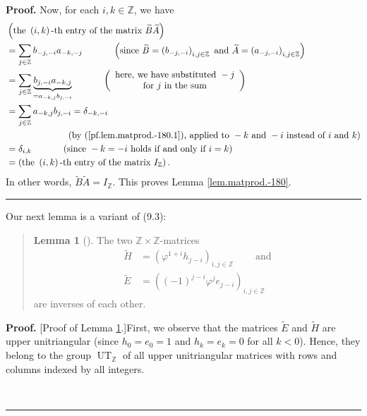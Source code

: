 \documentclass[numbers=enddot,12pt,final,onecolumn,notitlepage]{scrartcl}%
\newenvironment{statement}{\begin{quote}}{\end{quote}}
\theoremstyle{definition}
\newtheorem{lem}[theo]{Lemma}
\newenvironment{lemmain}[1][]
{\begin{statement}\begin{lem}[#1]}
{\end{lem}\end{statement}}
\newenvironment{proof}[1][Proof]{\noindent\textbf{#1.} }{\ \rule{0.5em}{0.5em}}
\newenvironment{lemmain}[1][Proof]{\noindent\textbf{#1.} }{\ \rule{0.5em}{0.5em}}
\let\sumnonlimits\sum
\renewcommand{\sum}{\sumnonlimits\limits}
\begin{document}
\begin{enumerate}
\begin{proof}
Now, for each $i,k\in\mathbb{Z}$, we have%
\begin{align*}
&  \left(  \text{the }\left(  i,k\right)  \text{-th entry of the matrix
}\widetilde{B}\widetilde{A}\right) \\
&  =\sum_{j\in\mathbb{Z}}b_{-j,-i}a_{-k,-j}\ \ \ \ \ \ \ \ \ \ \left(
\text{since }\widetilde{B}=\left(  b_{-j,-i}\right)  _{i,j\in\mathbb{Z}}\text{
and }\widetilde{A}=\left(  a_{-j,-i}\right)  _{i,j\in\mathbb{Z}}\right) \\
&  =\sum_{j\in\mathbb{Z}}\underbrace{b_{j,-i}a_{-k,j}}_{=a_{-k,j}b_{j,-i}%
}\ \ \ \ \ \ \ \ \ \ \left(
\begin{array}
[c]{c}%
\text{here, we have substituted }-j\\
\text{for }j\text{ in the sum}%
\end{array}
\right) \\
&  =\sum_{j\in\mathbb{Z}}a_{-k,j}b_{j,-i}=\delta_{-k,-i}\\
&  \ \ \ \ \ \ \ \ \ \ \ \ \ \ \ \ \ \ \ \ \left(  \text{by
(\ref{pf.lem.matprod.-180.1}), applied to }-k\text{ and }-i\text{ instead of
}i\text{ and }k\right) \\
&  =\delta_{i,k}\ \ \ \ \ \ \ \ \ \ \left(  \text{since }-k=-i\text{ holds if
and only if }i=k\right) \\
&  =\left(  \text{the }\left(  i,k\right)  \text{-th entry of the matrix
}I_{\mathbb{Z}}\right)  .
\end{align*}
In other words, $\widetilde{B}\widetilde{A}=I_{\mathbb{Z}}$. This proves Lemma
\ref{lem.matprod.-180}.
\end{proof}

Our next lemma is a variant of (9.3):

\begin{lemmain}
\label{lem.9.3.prime}The two $\mathbb{Z}\times\mathbb{Z}$-matrices%
\begin{align*}
\widetilde{H}  &  =\left(  \varphi^{1+i}h_{j-i}\right)  _{i,j\in\mathbb{Z}%
}\ \ \ \ \ \ \ \ \ \ \text{and}\\
\widetilde{E}  &  =\left(  \left(  -1\right)  ^{j-i}\varphi^{j}e_{j-i}\right)
_{i,j\in\mathbb{Z}}%
\end{align*}
are inverses of each other.
\end{lemmain}

\begin{proof}
[Proof of Lemma \ref{lem.9.3.prime}.]First, we observe that the matrices
$\widetilde{E}$ and $\widetilde{H}$ are upper unitriangular (since
$h_{0}=e_{0}=1$ and $h_{k}=e_{k}=0$ for all $k<0$). Hence, they belong to the
group $\operatorname*{UT}\nolimits_{\mathbb{Z}}$ of all upper unitriangular
matrices with rows and columns indexed by all integers.


\end{proof}
\end{enumerate}
\end{document}
